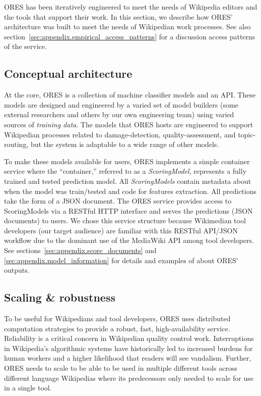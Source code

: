 
ORES has been iteratively engineered to meet the needs of Wikipedia editors and the tools that support their work.  In this section, we describe how ORES' architecture was built to meet the needs of Wikipedian work processes.  See also section~\ref{sec:appendix.empirical_access_patterns} for a discussion access patterns of the service.

\subsection{Conceptual architecture}
At the core, ORES is a collection of machine classifier models and an API.  These models are designed and engineered by a varied set of model builders (some external researchers and others by our own engineering team) using varied sources of \emph{training data}.  The models that ORES hosts are engineered to support Wikipedian processes related to damage-detection, quality-assessment, and topic-routing, but the system is adaptable to a wide range of other models.

To make these models available for users, ORES implements a simple container service where the ``container,'' referred to as a \emph{ScoringModel}, represents a fully trained and tested prediction model.  All \emph{ScoringModels} contain metadata about when the model was train/tested and code for features extraction.  All predictions take the form of a JSON document.  The ORES service provides access to ScoringModels via a RESTful HTTP interface and serves the predictions (JSON documents) to users.  We chose this service structure because Wikimedian tool developers (our target audience) are familiar with this RESTful API/JSON workflow due to the dominant use of the MediaWiki API among tool developers.  See sections~\ref{sec:appendix.score_documents} and \ref{sec:appendix.model_information} for details and examples of about ORES' outputs.

\subsection{Scaling \& robustness}
To be useful for Wikipedians and tool developers, ORES uses distributed computation strategies to provide a robust, fast, high-availability service.  Reliability is a critical concern in Wikipedian quality control work.  Interruptions in Wikipedia's algorithmic systems have historically led to increased burdens for human workers and a higher likelihood that readers will see vandalism\cite{geiger2013levee}.  Further, ORES needs to scale to be able to be used in multiple different tools across different language Wikipedias where its predecessors only needed to scale for use in a single tool.

